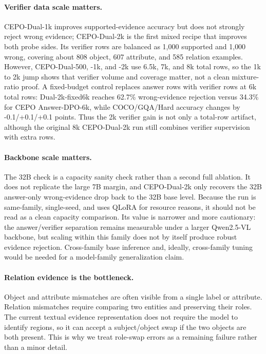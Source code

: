 \documentclass[10pt,twocolumn,letterpaper]{article}
\newcommand{\answerdpo}{CEPO Answer-DPO}
\newcommand{\dualonek}{CEPO-Dual-1k}
\newcommand{\dualtwok}{CEPO-Dual-2k}
\begin{document}
\paragraph{Verifier data scale matters.}
\dualonek{} improves supported-evidence accuracy but does not strongly reject
wrong evidence; \dualtwok{} is the first mixed recipe that improves both probe
sides. Its verifier rows are balanced as 1{,}000 supported and 1{,}000 wrong,
covering about 808 object, 607 attribute, and 585 relation examples. However,
CEPO-Dual-500, -1k, and -2k use 6.5k, 7k, and 8k total rows, so the 1k to 2k
jump shows that verifier volume and coverage matter, not a clean
mixture-ratio proof. A fixed-budget control replaces answer rows with verifier
rows at 6k total rows: Dual-2k-fixed6k reaches 62.7\% wrong-evidence rejection
versus 34.3\% for \answerdpo{}-6k, while COCO/GQA/Hard accuracy changes by
-0.1/+0.1/+0.1 points. Thus the 2k verifier gain is not only a total-row
artifact, although the original 8k \dualtwok{} run still combines verifier
supervision with extra rows.

\paragraph{Backbone scale matters.}
The 32B check is a capacity sanity check rather than a second full ablation.
It does not replicate the large 7B margin, and \dualtwok{} only recovers the
32B answer-only wrong-evidence drop back to the 32B base level. Because the run
is same-family, single-seed, and uses QLoRA for resource reasons, it should not
be read as a clean capacity comparison. Its value is narrower and more
cautionary: the answer/verifier separation remains measurable under a larger
Qwen2.5-VL backbone, but scaling within this family does not by itself produce
robust evidence rejection. Cross-family base inference and, ideally,
cross-family tuning would be needed for a model-family generalization claim.

\paragraph{Relation evidence is the bottleneck.}
Object and attribute mismatches are often visible from a single label or
attribute. Relation mismatches require comparing two entities and preserving
their roles. The current textual evidence representation does not require the
model to identify regions, so it can accept a subject/object swap if the two
objects are both present. This is why we treat role-swap errors as a remaining
failure rather than a minor detail.
\end{document}
